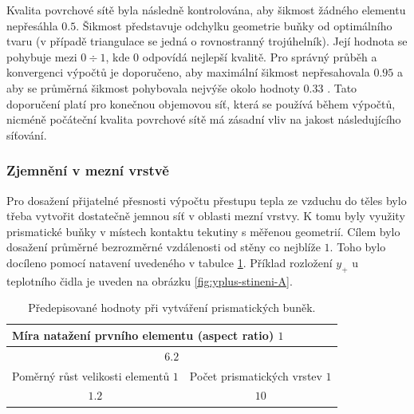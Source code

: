             Kvalita povrchové sítě byla následně kontrolována, aby šikmost žádného elementu nepřesáhla $0.5$. Šikmost představuje odchylku geometrie buňky od optimálního tvaru (v případě triangulace se jedná o rovnostranný trojúhelník). Její hodnota se pohybuje mezi $0 \div 1$, kde $0$ odpovídá nejlepší kvalitě. Pro správný průběh a konvergenci výpočtů je doporučeno, aby maximální šikmost nepřesahovala $0.95$ a aby se průměrná šikmost pohybovala nejvýše okolo hodnoty $0.33$ \cite{Ansys2020User}. Tato doporučení platí pro konečnou objemovou síť, která se používá během výpočtů, nicméně počáteční kvalita povrchové sítě má zásadní vliv na jakost následujícího síťování.
        \subsubsection{Zjemnění v mezní vrstvě}
            Pro dosažení přijatelné přesnosti výpočtu přestupu tepla ze vzduchu do těles bylo třeba vytvořit dostatečně jemnou síť v oblasti mezní vrstvy. K tomu byly využity prismatické buňky v místech kontaktu tekutiny s měřenou geometrií. Cílem bylo dosažení průměrné bezrozměrné vzdálenosti od stěny co nejblíže $1$. Toho bylo docíleno pomocí natavení uvedeného v tabulce \ref{tab:mezni-vrstva-nastaveni}. Příklad rozložení $y_+$ u teplotního čidla je uveden na obrázku \ref{fig:yplus-stineni-A}.

            \begin{table}[ht!]
                \centering
                \begin{tabular}{ll}
                    \multicolumn{2}{l}{Míra natažení prvního elementu (aspect ratio) $\unit{1}$}                            \\ \hline
                    \multicolumn{2}{c}{$6.2$}                                                                        \\ \hline
                    \multicolumn{1}{l|}{Poměrný růst velikosti elementů $\unit{1}$} & Počet prismatických vrstev $\unit{1}$ \\ \hline
                    \multicolumn{1}{c|}{$1.2$}                                      & \multicolumn{1}{c}{$10$}                
                \end{tabular}
                \caption{Předepisované hodnoty při vytváření prismatických buněk.}
                \label{tab:mezni-vrstva-nastaveni}
            \end{table}

